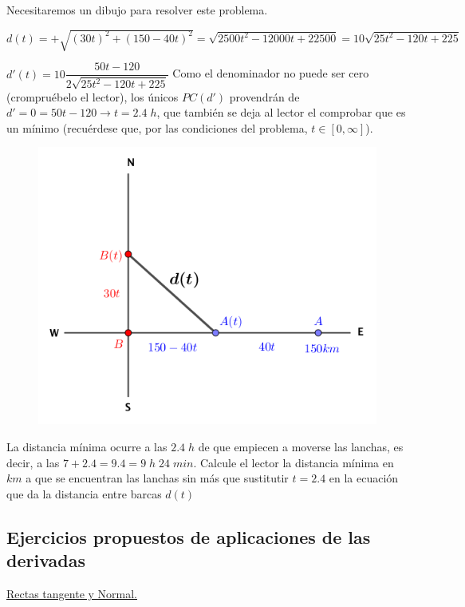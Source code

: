 	\begin{proofw}\renewcommand{\qedsymbol}{$\diamond$}	
	
	Necesitaremos un dibujo para resolver este problema.
	\begin{multicols}{2}
	$d(t)=+\sqrt{(30t)^2+(150-40t)^2}=\sqrt{2500t^2-12000t+22500}=10\sqrt{25t^2-120t+225}	$
	
	$d'(t)=10 \dfrac {50t-120}{2\sqrt{25t^2-120t+225}}$ Como el denominador no puede ser cero (crompruébelo el lector), los únicos $PC(d')$ provendrán de $d'=0=50t-120 \to t=2.4\; h$, que también se deja al lector el comprobar que es un mínimo (recuérdese que, por las condiciones del problema, $t\in[0,\infty]$).
	
	\begin{figure}[H]
	\centering
	\includegraphics[width=.45\textwidth]{imagenes/imagenes05/T05IM25.png}
	\end{figure}
	\end{multicols}	
	La distancia mínima ocurre a las $2.4\; h$ de que empiecen a moverse las lanchas, es decir, a las $7+2.4=9.4=9\; h \; 24\; min$. Calcule el lector la distancia mínima en $km$ a que se encuentran las lanchas sin más que sustitutir $t=2.4$ en la ecuación que da la distancia entre barcas $d(t)$
	
	\end{proofw}

	

\subsection{Ejercicios propuestos de aplicaciones de las derivadas}

	\underline{Rectas tangente y Normal.}

